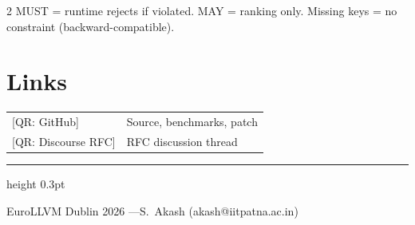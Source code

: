 \documentclass[10pt,a4paper]{article}
\begin{document}
\begin{multicols}{2}
\vspace{1pt}
{\scriptsize MUST = runtime rejects if violated.
MAY = ranking only. Missing keys = no constraint (backward-compatible).}

\section{Links}

\begin{tabular}{@{}lp{3.5cm}@{}}
{[QR: GitHub]}        & Source, benchmarks, patch \\
{[QR: Discourse RFC]} & RFC discussion thread \\
\end{tabular}

\end{multicols}

\vspace*{\fill}
\hrule height 0.3pt
\vspace{2pt}
\begin{center}
\small EuroLLVM Dublin 2026 \enspace---\enspace S.\ Akash (akash@iitpatna.ac.in)
\end{center}
\end{document}
